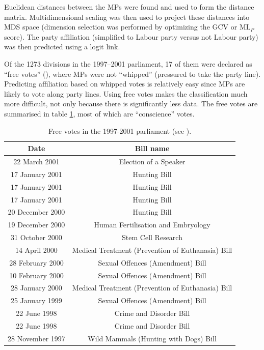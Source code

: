 Euclidean distances between the MPs were found and used to form the distance matrix. Multidimensional scaling was then used to project these distances into MDS space (dimension selection was performed by optimizing the GCV or $\text{ML}_P$ score). The party affiliation (simplified to Labour party versus not Labour party) was then predicted using a logit link.

Of the 1273 divisions in the 1997--2001 parliament, 17 of them were declared  as ``free votes'' (\cite{freevotes}), where MPs were not ``whipped'' (pressured to take the party line). Predicting affiliation based on whipped votes is relatively easy since MPs are likely to vote along party lines. Using free votes makes the classification much more difficult, not only because there is significantly less data. The free votes are summarised in table \ref{free-vote-description}, most of which are ``conscience'' votes.

\begin{table}  
\begin{centering}
\begin{tabular}{cc}
	Date & Bill name \\
    \hline
22 March 2001    &   Election of a Speaker \\
17 January 2001  &   Hunting Bill \\
17 January 2001  &   Hunting Bill \\
17 January 2001  &   Hunting Bill\\
20 December 2000 &   Hunting Bill \\
19 December 2000 &   Human Fertilisation and Embryology\\
31 October 2000  &   Stem Cell Research \\
14 April 2000    &   Medical Treatment (Prevention of Euthanasia) Bill \\
28 February 2000 &   Sexual Offences (Amendment) Bill \\
10 February 2000 &   Sexual Offences (Amendment) Bill \\
28 January 2000  &   Medical Treatment (Prevention of Euthanasia) Bill\\
25 January 1999  &   Sexual Offences (Amendment) Bill\\
22 June 1998     &  Crime and Disorder Bill \\
22 June 1998     &  Crime and Disorder Bill \\
28 November 1997 &  Wild Mammals (Hunting with Dogs) Bill\\
  \end{tabular}
\caption{Free votes in the 1997-2001 parliament (see \cite{freevotes}).}
\label{free-vote-description}
\end{centering}
\end{table}

